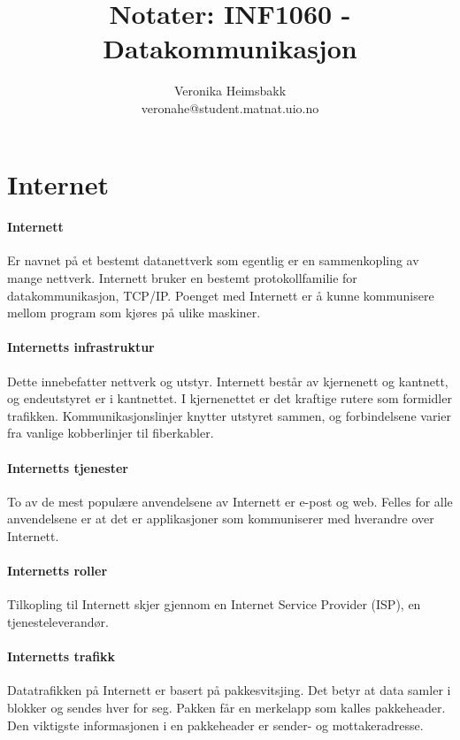 \documentclass[11pt,a4paper]{article}
\title{Notater: INF1060 - Datakommunikasjon}
\author{Veronika Heimsbakk \\ 
veronahe@student.matnat.uio.no}
\begin{document}
\maketitle{}
\tableofcontents
\newpage{}

\section{Internet}
\paragraph{Internett} 
Er navnet på et bestemt datanettverk som egentlig er en sammenkopling av mange nettverk. Internett bruker en bestemt protokollfamilie for datakommunikasjon, TCP/IP. Poenget med Internett er å kunne kommunisere mellom program som kjøres på ulike maskiner.

\paragraph{Internetts infrastruktur}
Dette innebefatter nettverk og utstyr. Internett består av kjernenett og kantnett, og endeutstyret er i kantnettet. I kjernenettet er det kraftige rutere som formidler trafikken. Kommunikasjonslinjer knytter utstyret sammen, og forbindelsene varier fra vanlige kobberlinjer til fiberkabler.

\paragraph{Internetts tjenester}
To av de mest populære anvendelsene av Internett er e-post og web. Felles for alle anvendelsene er at det er applikasjoner som kommuniserer med hverandre over Internett.

\paragraph{Internetts roller}
Tilkopling til Internett skjer gjennom en Internet Service Provider (ISP), en tjenesteleverandør. 

\paragraph{Internetts trafikk}
Datatrafikken på Internett er basert på pakkesvitsjing. Det betyr at data samler i blokker og sendes hver for seg. Pakken får en merkelapp som kalles pakkeheader. Den viktigste informasjonen i en pakkeheader er sender- og mottakeradresse. 
\end{document}
